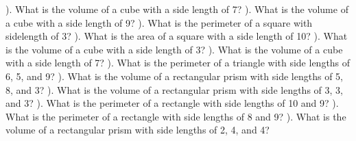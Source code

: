 \documentclass{article}%
\begin{document}
\newline%
). What is the volume of a cube with a side length of 7?%
\newline%
\newline%
). What is the volume of a cube with a side length of 9?%
\newline%
\newline%
). What is the perimeter of a square with sidelength of 3?%
\newline%
\newline%
). What is the area of a square with a side length of 10?%
\newline%
\newline%
). What is the volume of a cube with a side length of 3?%
\newline%
\newline%
). What is the volume of a cube with a side length of 7?%
\newline%
\newline%
). What is the perimeter of a triangle with side lengths of 6, 5, and 9?%
\newline%
\newline%
). What is the volume of a rectangular prism with side lengths of 5, 8, and 3?%
\newline%
\newline%
). What is the volume of a rectangular prism with side lengths of 3, 3, and 3?%
\newline%
\newline%
). What is the perimeter of a rectangle with side lengths of 10 and 9?%
\newline%
\newline%
). What is the perimeter of a rectangle with side lengths of 8 and 9?%
\newline%
\newline%
). What is the volume of a rectangular prism with side lengths of 2, 4, and 4?%
\newline%
\end{document}
